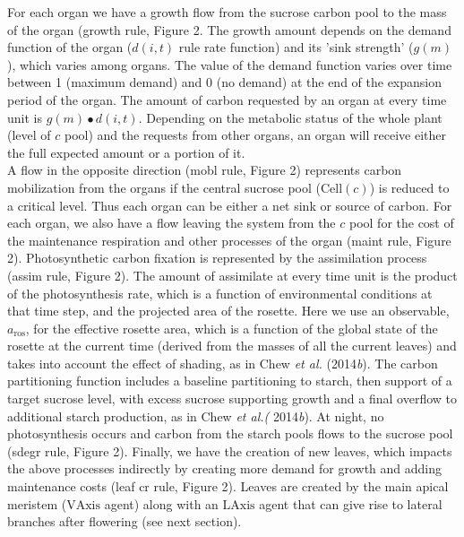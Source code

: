 \documentclass[phd]{infthesis}
\begin{document}
For each organ we have a growth flow from the sucrose carbon pool to the
mass of the organ (growth rule, ­­­Figure 2. The growth amount depends
on the demand function of the organ (\(d(i,t)\) rule rate function) and
its 'sink strength' (\(g(m)\)), which varies among organs. The value of
the demand function varies over time between 1 (maximum demand) and 0
(no demand) at the end of the expansion period of the organ. The amount
of carbon requested by an organ at every time unit is
\(g\left( m \right) \bullet d(i,t)\). Depending on the metabolic status
of the whole plant (level of \(c\) pool) and the requests from other
organs, an organ will receive either the full expected amount or a
portion of it.\\
A flow in the opposite direction (mobl rule, ­­­Figure 2) represents
carbon mobilization from the organs if the central sucrose pool
(\(\text{Cell}(c)\)) is reduced to a critical level. Thus each organ can
be either a net sink or source of carbon. For each organ, we also have a
flow leaving the system from the \(c\) pool for the cost of the
maintenance respiration and other processes of the organ (maint rule,
­­­Figure 2). Photosynthetic carbon fixation is represented by the
assimilation process (assim rule, ­­­Figure 2). The amount of assimilate
at every time unit is the product of the photosynthesis rate, which is a
function of environmental conditions at that time step, and the
projected area of the rosette. Here we use an observable,
\(a_{\text{ros}}\), for the effective rosette area, which is a function
of the global state of the rosette at the current time (derived from the
masses of all the current leaves) and takes into account the effect of
shading, as in Chew \emph{et al.} (2014\emph{b}). The carbon
partitioning function includes a baseline partitioning to starch, then
support of a target sucrose level, with excess sucrose supporting growth
and a final overflow to additional starch production, as in Chew
\emph{et al.(} 2014\emph{b}). At night, no photosynthesis occurs and
carbon from the starch pools flows to the sucrose pool (sdegr rule,
­­­Figure 2). Finally, we have the creation of new leaves, which impacts
the above processes indirectly by creating more demand for growth and
adding maintenance costs (leaf cr rule, ­­­Figure 2). Leaves are created
by the main apical meristem (\(\text{VAxis}\) agent) along with an
\(\text{LAxis}\) agent that can give rise to lateral branches after
flowering (see next section).
\end{document}
